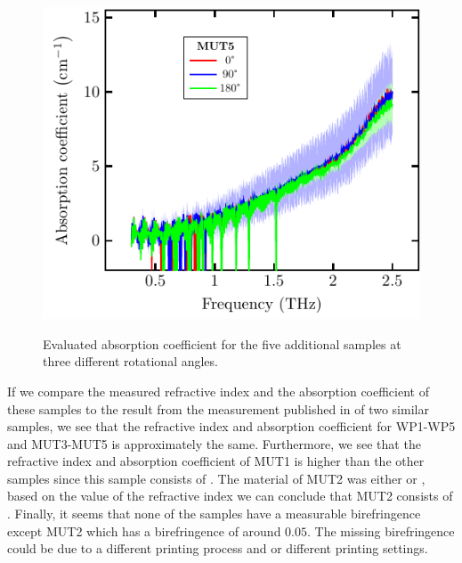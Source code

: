 \begin{figure}[H]
\subcaptionbox{\label{fig:ceramic_MUT5_abs}}
    {\includegraphics[width=0.45\linewidth]{images/7_appendix/plots/real_abs/MUT5.pdf}}
\caption{Evaluated absorption coefficient for the five additional samples at three different rotational angles.}
\label{fig:ceramic_MUTs_abs}
\end{figure}

If we compare the measured refractive index and the absorption coefficient of these  samples to the result from the measurement published in \cite{Ornik2018} of two similar  samples, we see that the refractive index and absorption coefficient for WP1-WP5 and MUT3-MUT5 is approximately the same. Furthermore, we see that the refractive index and absorption coefficient of MUT1 is higher than the other samples since this sample consists of . The material of MUT2 was either  or , based on the value of the refractive index we can conclude that MUT2 consists of . Finally, it seems that none of the samples have a measurable birefringence except MUT2 which has a birefringence of around $0.05$. The missing birefringence could be due to a different printing process and or different printing settings.
